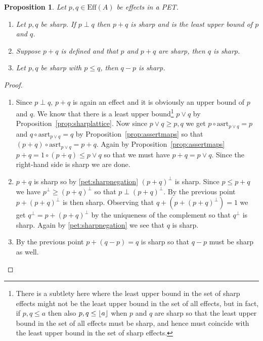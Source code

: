 \documentclass[a4paper,onecolumn,10pt,accepted=2019-05-03, issue=1, volume=1, shorttitle=papers/compositionality-1-1]{compositionalityarticle}
\DeclarePairedDelimiter{\floor}{\lfloor}{\rfloor}
\newcounter{counter}
\numberwithin{counter}{section}
\newtheorem{proposition}[counter]{Proposition}
\newcommand{\asrt}{\text{asrt}}
\newcommand{\pred}{\text{Eff}}
\begin{document}


\begin{proposition}\label{prop:sharpadd}
	Let $p,q\in \pred(A)$ be effects in a PET.
	\begin{enumerate}
		\item Let $p,q$ be sharp. If $p\perp q$ then $p+q$ is sharp and is the least upper bound of $p$ and $q$.
		\item Suppose $p+q$ is defined and that $p$ and $p+q$ are sharp, then $q$ is sharp.
		\item Let $p,q$ be sharp with $p\leq q$, then $q-p$ is sharp.
	\end{enumerate}
\end{proposition}
\begin{proof}~
\begin{enumerate}
	\item Since $p\perp q$, $p+q$ is again an effect and it is obviously an upper bound of $p$ and $q$. We know that there is a least upper bound\footnote{There is a subtlety here where the least upper bound in the set of sharp effects might not be the least upper bound in the set of all effects, but in fact, if $p,q\leq a$ then also $p,q\leq \floor{a}$ when $p$ and $q$ are sharp so that the least upper bound in the set of all effects must be sharp, and hence must coincide with the least upper bound in the set of sharp effects.} $p\vee q$ by Proposition~\ref{prop:sharplattice}. Now since $p\vee q\geq p,q$ we get $p\circ\asrt_{p\vee q}=p$ and $q\circ\asrt_{p\vee q} = q$ by Proposition~\ref{prop:assertmaps} so that $(p+q)\circ\asrt_{p\vee q} = p+q$. Again by Proposition~\ref{prop:assertmaps} $p+q = 1\circ(p+q)\leq p\vee q$ so that we must have $p+q = p\vee q$. Since the right-hand side is sharp we are done.
	\item $p+q$ is sharp so by \ref{pet:sharpnegation} $(p+q)^\perp$ is sharp. Since $p\leq p+q$ we have $p^\perp\geq (p+q)^\perp$ so that $p\perp (p+q)^\perp$. By the previous point $p+(p+q)^\perp$ is then sharp. Observing that $q+ (p+(p+q)^\perp) = 1$ we get $q^\perp = p+(p+q)^\perp$ by the uniqueness of the complement so that $q^\perp$ is sharp. Again by \ref{pet:sharpnegation} we see that $q$ is sharp.
	\item By the previous point $p+ (q-p) = q$ is sharp so that $q-p$ must be sharp as well. \qedhere
\end{enumerate}
\end{proof}
\end{document}
